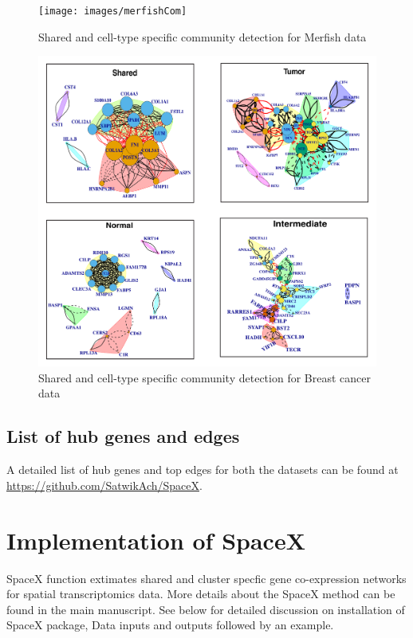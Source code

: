 \documentclass[
]{book}
\begin{document}
\begin{figure}

{\centering \texttt{[image: images/merfishCom]} 

}

\caption{Shared and cell-type specific community detection for Merfish data}\label{fig:comMERFISH}
\end{figure}

\begin{figure}

{\centering \includegraphics[width=0.8\linewidth]{images/BC_Com} 

}

\caption{Shared and cell-type specific community detection for Breast cancer data}\label{fig:comBC}
\end{figure}

\hypertarget{list-of-hub-genes-and-edges}{%
\section{List of hub genes and edges}\label{list-of-hub-genes-and-edges}}

A detailed list of hub genes and top edges for both the datasets can be found at \url{https://github.com/SatwikAch/SpaceX}.

\hypertarget{ImplementSpaceX}{%
\chapter{Implementation of SpaceX}\label{ImplementSpaceX}}

SpaceX function extimates shared and cluster specfic gene co-expression networks for spatial transcriptomics data. More details about the SpaceX method can be found in the main manuscript. See below for detailed discussion on installation of SpaceX package, Data inputs and outputs followed by an example.
\end{document}
